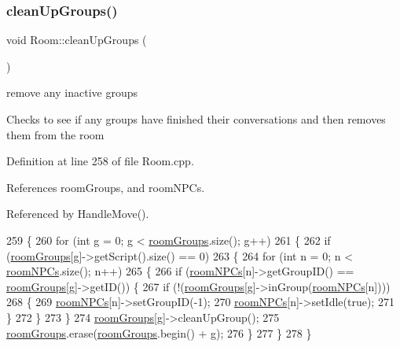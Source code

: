 \subsubsection{\texorpdfstring{clean\+Up\+Groups()}{cleanUpGroups()}}
{\footnotesize\ttfamily void Room\+::clean\+Up\+Groups (\begin{DoxyParamCaption}{ }\end{DoxyParamCaption})}



remove any inactive groups 

Checks to see if any groups have finished their conversations and then removes them from the room 

Definition at line 258 of file Room.\+cpp.



References room\+Groups, and room\+N\+P\+Cs.



Referenced by Handle\+Move().


\begin{DoxyCode}
259 \{
260     \textcolor{keywordflow}{for} (\textcolor{keywordtype}{int} g = 0; g < \hyperlink{class_room_a2d63fa17f30d50dd5267f04170a662b0}{roomGroups}.size(); g++)
261     \{
262         \textcolor{keywordflow}{if} (\hyperlink{class_room_a2d63fa17f30d50dd5267f04170a662b0}{roomGroups}[g]->getScript().size() == 0)
263         \{
264             \textcolor{keywordflow}{for} (\textcolor{keywordtype}{int} n = 0; n < \hyperlink{class_room_a34bdf24cc8c52d638bcfd851c295f23b}{roomNPCs}.size(); n++)
265             \{
266                 \textcolor{keywordflow}{if} (\hyperlink{class_room_a34bdf24cc8c52d638bcfd851c295f23b}{roomNPCs}[n]->getGroupID() == \hyperlink{class_room_a2d63fa17f30d50dd5267f04170a662b0}{roomGroups}[g]->getID()) \{
267                     \textcolor{keywordflow}{if} (!(\hyperlink{class_room_a2d63fa17f30d50dd5267f04170a662b0}{roomGroups}[g]->inGroup(\hyperlink{class_room_a34bdf24cc8c52d638bcfd851c295f23b}{roomNPCs}[n])))
268                     \{
269                         \hyperlink{class_room_a34bdf24cc8c52d638bcfd851c295f23b}{roomNPCs}[n]->setGroupID(-1);
270                         \hyperlink{class_room_a34bdf24cc8c52d638bcfd851c295f23b}{roomNPCs}[n]->setIdle(\textcolor{keyword}{true});
271                     \}
272                 \}
273             \}
274             \hyperlink{class_room_a2d63fa17f30d50dd5267f04170a662b0}{roomGroups}[g]->cleanUpGroup();
275             \hyperlink{class_room_a2d63fa17f30d50dd5267f04170a662b0}{roomGroups}.erase(\hyperlink{class_room_a2d63fa17f30d50dd5267f04170a662b0}{roomGroups}.begin() + g);
276         \}
277     \}
278 \}
\end{DoxyCode}
\mbox{\label{class_room_a7d4ef90e7eb605f2c198b28175900d45}} 

